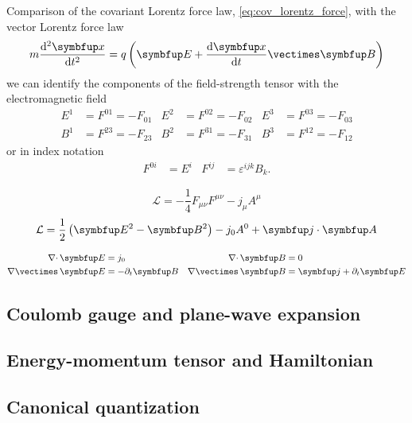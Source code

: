 Comparison of the covariant Lorentz force law, \cref{eq:cov_lorentz_force}, with the vector Lorentz force law
\begin{equation}
	m
	\odv[order={2}]{\vb{x}}{t}
	=
	q\left(
		\vb{E}
		+
		\odv{\vb{x}}{t}
		\vcross
		\vb{B}
	\right)
\end{equation}
we can identify the components of the field-strength tensor with the electromagnetic field~\cite[p.~245]{Zee2013}
\begin{align}
	E^1
	&=
	F^{01}
	=
	-
	F_{01}
	&
	E^2
	&=
	F^{02}
	=
	-
	F_{02}
	&
	E^3
	&=
	F^{03}
	=
	-
	F_{03}
	\\
	B^1
	&=
	F^{23}
	=
	-
	F_{23}
	&
	B^2
	&=
	F^{31}
	=
	-
	F_{31}
	&
	B^3
	&=
	F^{12}
	=
	-
	F_{12}
\end{align}
or in index notation
\begin{align}
	F^{0i}
	&=
	E^i
	&
	F^{ij}
	&=
	\varepsilon^{ijk}
	B_k
	.
\end{align}

\begin{equation}
	\mathcal{L}
	=
	-
	\frac{1}{4}
	F_{\mu\nu}
	F^{\mu\nu}
	-
	j_\mu A^\mu
\end{equation}
\begin{equation}
	\mathcal{L}
	=
	\frac{1}{2}
	\left(
		\vb{E}^2
		-
		\vb{B}^2
	\right)
	-
	j_0A^0
	+
	\vb{j}
	\vdot
	\vb{A}
\end{equation}

\begin{align}
	\div\vb{E}
	&=
	j_0
	&
	\div\vb{B}
	&=
	0
	\\
	\curl\vb{E}
	&=
	-\partial_t\vb{B}
	&
	\curl\vb{B}
	&=
	\vb{j}
	+
	\partial_t\vb{E}
\end{align}

\subsection{Coulomb gauge and plane-wave expansion}


\subsection{Energy-momentum tensor and Hamiltonian}

\subsection{Canonical quantization}

